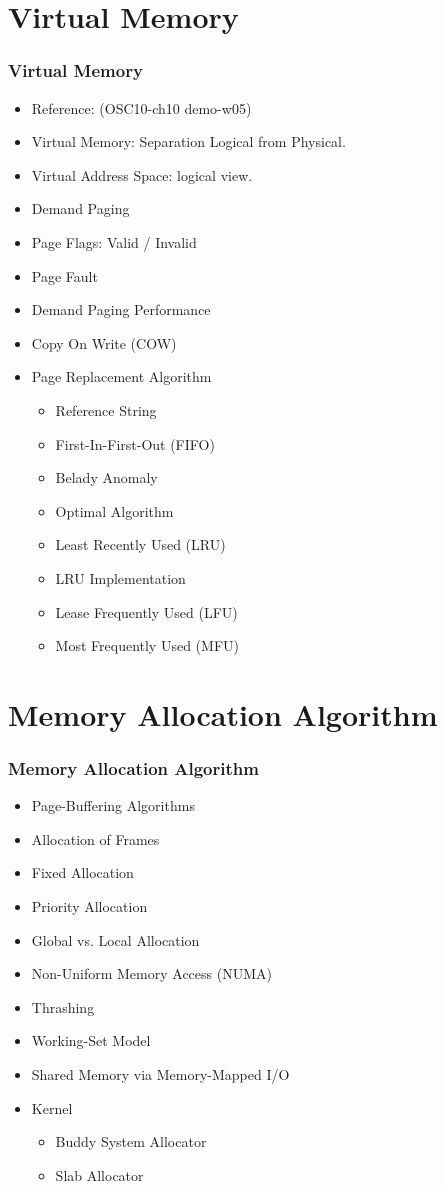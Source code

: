 \documentclass[xcolor=table, notheorems, hyperref={pdfpagelabels=false}]{beamer}
\begin{document}
\section{Virtual Memory}
\begin{frame}
\frametitle{Virtual Memory}
\begin{itemize}
\item Reference: (OSC10-ch10 demo-w05)
\item Virtual Memory: Separation Logical from Physical.
\item Virtual Address Space: logical view.
\item Demand Paging
\item Page Flags: Valid / Invalid
\item Page Fault
\item Demand Paging Performance
\item Copy On Write (COW)
\item Page Replacement Algorithm
\begin{itemize}
\item Reference String
\item First-In-First-Out (FIFO)
\item Belady Anomaly
\item Optimal Algorithm
\item Least Recently Used (LRU)
\item LRU Implementation
\item Lease Frequently Used (LFU)
\item Most Frequently Used (MFU) 
\end{itemize}
\end{itemize}
\end{frame}

\section{Memory Allocation Algorithm}
\begin{frame}
\frametitle{Memory Allocation Algorithm}
\begin{itemize}
\item Page-Buffering Algorithms
\item Allocation of Frames
\item Fixed Allocation
\item Priority Allocation
\item Global vs. Local Allocation
\item Non-Uniform Memory Access (NUMA)
\item Thrashing
\item Working-Set Model
\item Shared Memory via Memory-Mapped I/O
\item Kernel
\begin{itemize}
\item Buddy System Allocator
\item Slab Allocator
\end{itemize}
\end{itemize}
\end{frame}
\end{document}
